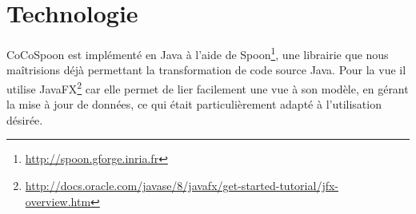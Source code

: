 \section{Technologie}
CoCoSpoon est implémenté en Java à l'aide de Spoon\footnote{\url{http://spoon.gforge.inria.fr}}, une librairie que nous maîtrisions déjà permettant la transformation de code source Java. Pour la vue il utilise JavaFX\footnote{\url{http://docs.oracle.com/javase/8/javafx/get-started-tutorial/jfx-overview.htm}} car elle permet de lier facilement une vue à son modèle, en gérant la mise à jour de données, ce qui était particulièrement adapté à l'utilisation désirée. 